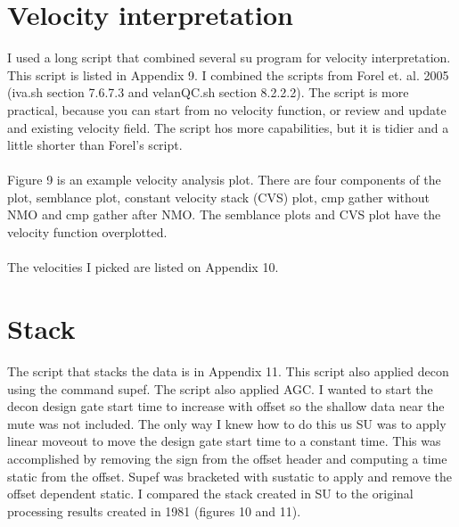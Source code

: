 \section{Velocity interpretation}
I used a long script that combined several su program for velocity interpretation.  This script is listed in Appendix 9.   I combined the scripts from Forel et. al. 2005 (iva.sh  section 7.6.7.3 and velanQC.sh section 8.2.2.2).  The script is more practical, because you can start from no velocity function, or review and update and existing velocity field.  The script hos more capabilities, but it is tidier and a little shorter than Forel's script. \\
\\
Figure 9 is an example velocity analysis plot.  There are four components of the plot, semblance plot, constant velocity stack (CVS) plot, cmp gather without NMO and cmp gather after NMO.  The semblance plots and CVS plot have the velocity function overplotted.\\
\\
The velocities I picked are listed on Appendix 10.\\


\section{Stack}
The script that stacks the data is in Appendix 11.  This script also applied decon using the command supef.  The script also applied AGC.  I wanted to start the decon design gate start time to increase with offset so the shallow data near the mute was not included.  The only way I knew how to do this us SU was to apply linear moveout to move the design gate start time to a constant time.  This was accomplished by removing the sign from the offset header and computing a time static from the offset.  Supef was bracketed with sustatic to apply and remove the offset dependent static.  I compared the stack created in SU to the original processing results created  in 1981 (figures 10 and 11).\\
